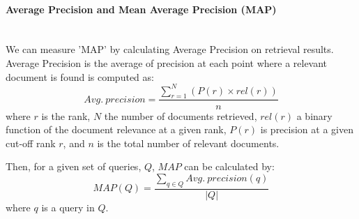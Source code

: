 \paragraph{Average Precision and Mean Average Precision (MAP) }
\ \\
We can measure 'MAP' by calculating Average Precision on retrieval results. Average Precision is the average of precision at each point where a relevant document is found is computed as:
\begin{equation}
Avg. \: precision=\frac{\sum_{r=1}^{N}(P(r)\times rel(r))}{n}
\end{equation}
\noindent
where $ r $ is the rank, $ N $ the number of documents retrieved, $ rel(r) $ a binary function of the document relevance at a given rank, $ P(r) $ is precision at a given cut-off rank $ r $, and $ n $ is the total number of relevant documents.

Then, for a given set of queries, $ Q $, $ MAP $ can be calculated by:
\begin{equation}
MAP(Q)=\frac{\sum_{q\in Q}Avg. \: precision(q)}{|Q|}
\end{equation}
\noindent
where $ q $ is a query in $ Q $.